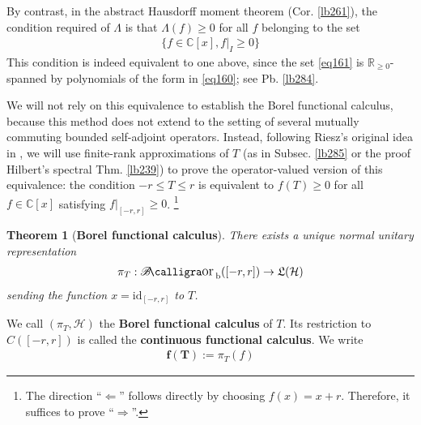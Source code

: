 \documentclass[12pt,b5paper,notitlepage]{article}
\theoremstyle{definition}
\theoremstyle{plain}
\newtheorem{thm}[df]{Theorem}
\DeclareMathOperator{\Borb}{{\mathscr{B}\text{\kern -2pt {\calligra\large or}}\,}_{\mathrm b}}
\newcommand{\fk}{\mathfrak}
\newcommand{\id}{\mathrm{id}}
\newcommand{\Cbb}{\mathbb C}
\newcommand{\Rbb}{\mathbb R}
\newcommand{\MH}{\mathcal H}
\numberwithin{equation}{section}
\begin{document}
By contrast, in the abstract Hausdorff moment theorem (Cor. \ref{lb261}), the condition required of $\Lambda$ is that $\Lambda(f)\geq0$ for all $f$ belonging to the set
\begin{align}\label{eq161}
\{f\in\Cbb[x],f|_I\geq0\}
\end{align}
This condition is indeed equivalent to one above, since the set \eqref{eq161} is $\Rbb_{\geq0}$-spanned by polynomials of the form in \eqref{eq160}; see Pb. \ref{lb284}.


We will not rely on this equivalence to establish the Borel functional calculus, because this method does not extend to the setting of several mutually commuting bounded self-adjoint operators. Instead, following Riesz's original idea in \cite{Rie13}, we will use finite-rank approximations of $T$ (as in Subsec. \ref{lb285} or the proof Hilbert's spectral Thm. \ref{lb239}) to  prove the operator-valued version of this equivalence: the condition $-r\leq T\leq r$ is equivalent to $f(T)\geq0$ for all $f\in\Cbb[x]$ satisfying $f|_{[-r,r]}\geq0$. \footnote{The direction ``$\Leftarrow$'' follows directly by choosing $f(x)=x+r$. Therefore, it suffices to prove ``$\Rightarrow$''.}






\begin{thm}[\textbf{Borel functional calculus}]\label{lb283}
There exists a unique normal unitary representation
\begin{align*}
\pi_T:\Borb([-r,r])\rightarrow\fk L(\MH)
\end{align*}
sending the function $x=\id_{[-r,r]}$ to $T$.
\end{thm}

We call $(\pi_T,\MH)$ the \textbf{Borel functional calculus}  of $T$. Its restriction to $C([-r,r])$ is called the \textbf{continuous functional calculus}.  We write 
\begin{align*}
\pmb{f(T)}:=\pi_T(f)
\end{align*}
\end{document}
